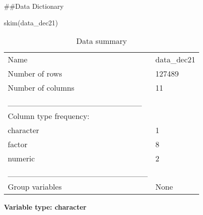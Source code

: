 \documentclass[
]{article}
\newenvironment{Shaded}{\begin{snugshade}}{\end{snugshade}}
\newcommand{\FunctionTok}[1]{\textcolor[rgb]{0.00,0.00,0.00}{#1}}
\newcommand{\NormalTok}[1]{#1}
\begin{document}
\#\#Data Dictionary

\begin{Shaded}
\begin{Highlighting}[]
\FunctionTok{skim}\NormalTok{(data\_dec21)}
\end{Highlighting}
\end{Shaded}

\begin{longtable}[]{@{}ll@{}}
\caption{Data summary}\tabularnewline
\toprule()
\endhead
Name & data\_dec21 \\
Number of rows & 127489 \\
Number of columns & 11 \\
\_\_\_\_\_\_\_\_\_\_\_\_\_\_\_\_\_\_\_\_\_\_\_ & \\
Column type frequency: & \\
character & 1 \\
factor & 8 \\
numeric & 2 \\
\_\_\_\_\_\_\_\_\_\_\_\_\_\_\_\_\_\_\_\_\_\_\_\_ & \\
Group variables & None \\
\bottomrule()
\end{longtable}

\textbf{Variable type: character}
\end{document}

